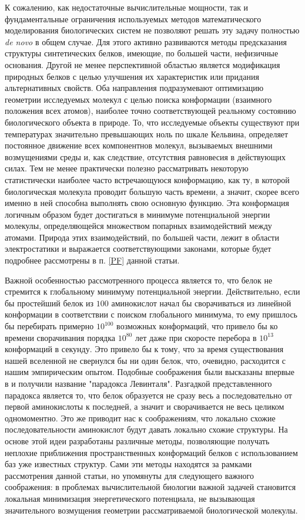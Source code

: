   К сожалению, как недостаточные вычислительные мощности, так и фундаментальные ограничения используемых методов математического моделирования биологических систем не позволяют решать эту задачу полностью \textit{de novo} в общем случае.
  Для этого активно развиваются методы предсказания структуры синтетических белков, имеющие, по большей части, нефизичные основания.
  Другой не менее перспективной областью является модификация природных белков с целью улучшения их характеристик или придания альтернативных свойств.
  Оба направления подразумевают оптимизацию геометрии исследуемых молекул с целью поиска конформации (взаимного положения всех атомов), наиболее точно соответствующей реальному состоянию биологического объекта в природе.
  То, что исследуемые объекты существуют при температурах значительно превышающих ноль по шкале Кельвина, определяет постоянное движение всех компонентнов молекул, вызываемых внешними возмущениями среды и, как следствие, отсутствия равновесия в действующих силах.
  Тем не менее практически полезно рассматривать некоторую статистически наиболее часто встречающуюся конформацию, как ту, в которой биологическая молекула проводит большую часть времени, а значит, скорее всего именно в ней способна выполнять свою основную функцию.
  Эта конформация логичным образом будет достигаться в минимуме потенциальной энергии молекулы, определяющейся множеством попарных взаимодействий между атомами.
  Природа этих взаимодействий, по большей части, лежит в области электростатики и выражается соответствующими законами, которые будет подробнее рассмотрены в п. \ref{PF} данной статьи.

  Важной особенностью рассмотренного процесса является то, что белок не стремится к глобальному минимуму потенциальной энергии.
  Действительно, если бы простейший белок из $100$ аминокислот начал бы сворачиваться из линейной конформации в соответствии с поиском глобального минимума, то ему пришлось бы перебирать примерно $10^{100}$ возможных конформаций, что привело бы ко времени сворачивания порядка $10^{80}$ лет даже при скоросте перебора в $10^{13}$ конформаций в секунду.
  Это привело бы к тому, что за время существования нашей вселенной не свернулся бы ни один белок, что, очевидно, расходится с нашим эмпирическим опытом.
  Подобные соображения были высказаны впервые в \cite{levinthal1969} и получили название "парадокса Левинталя".
  Разгадкой представленного парадокса является то, что белок образуется не сразу весь а последовательно от первой аминокислоты к последней, а значит и сворачивается не весь целиком одномоментно.
  Это же приводит нас к соображениям, что локально схожие последовательности аминокислот будут давать локально схожие структуры.
  На основе этой идеи разработаны различные методы, позволяющие получать неплохие приближения пространственных конформаций белков с использованием баз уже известных структур.
  Сами эти методы находятся за рамками рассмотрения данной статьи, но упомянуты для следующего важного соображения: в проблемах вычислительной биологии важной задачей становится локальная минимизация энергетического потенциала, не вызывающая значительного возмущения геометрии рассматриваемой биологической молекулы.

